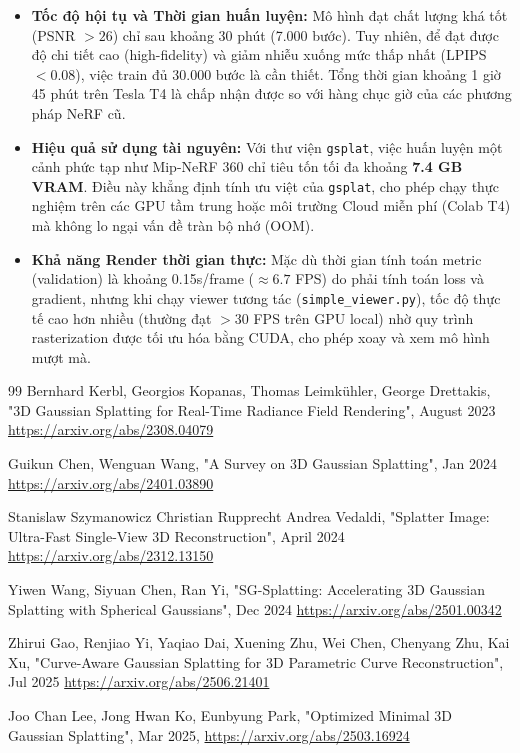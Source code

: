 \begin{itemize}
    \item \textbf{Tốc độ hội tụ và Thời gian huấn luyện:}
    Mô hình đạt chất lượng khá tốt (PSNR $> 26$) chỉ sau khoảng 30 phút (7.000 bước). Tuy nhiên, để đạt được độ chi tiết cao (high-fidelity) và giảm nhiễu xuống mức thấp nhất (LPIPS $< 0.08$), việc train đủ 30.000 bước là cần thiết. Tổng thời gian khoảng 1 giờ 45 phút trên Tesla T4 là chấp nhận được so với hàng chục giờ của các phương pháp NeRF cũ.

    \item \textbf{Hiệu quả sử dụng tài nguyên:}
    Với thư viện \texttt{gsplat}, việc huấn luyện một cảnh phức tạp như Mip-NeRF 360 chỉ tiêu tốn tối đa khoảng \textbf{7.4 GB VRAM}. Điều này khẳng định tính ưu việt của \texttt{gsplat}, cho phép chạy thực nghiệm trên các GPU tầm trung hoặc môi trường Cloud miễn phí (Colab T4) mà không lo ngại vấn đề tràn bộ nhớ (OOM).

    \item \textbf{Khả năng Render thời gian thực:}
    Mặc dù thời gian tính toán metric (validation) là khoảng 0.15s/frame ($\approx 6.7$ FPS) do phải tính toán loss và gradient, nhưng khi chạy viewer tương tác (\texttt{simple\_viewer.py}), tốc độ thực tế cao hơn nhiều (thường đạt $>30$ FPS trên GPU local) nhờ quy trình rasterization được tối ưu hóa bằng CUDA, cho phép xoay và xem mô hình mượt mà.
\end{itemize}

\newpage
\begin{thebibliography}{99}
  Bernhard Kerbl, Georgios Kopanas, Thomas Leimkühler, George Drettakis, "3D Gaussian Splatting for Real-Time Radiance Field Rendering", August 2023 \url{https://arxiv.org/abs/2308.04079}

  Guikun Chen, Wenguan Wang, "A Survey on 3D Gaussian Splatting", Jan 2024 \url{https://arxiv.org/abs/2401.03890}

  Stanislaw Szymanowicz Christian Rupprecht Andrea Vedaldi, "Splatter Image: Ultra-Fast Single-View 3D Reconstruction", April 2024 \url{https://arxiv.org/abs/2312.13150}

 Yiwen Wang, Siyuan Chen, Ran Yi, "SG-Splatting: Accelerating 3D Gaussian Splatting with Spherical Gaussians", Dec 2024 \url{https://arxiv.org/abs/2501.00342}

 Zhirui Gao, Renjiao Yi, Yaqiao Dai, Xuening Zhu, Wei Chen, Chenyang Zhu, Kai Xu, "Curve-Aware Gaussian Splatting for 3D Parametric Curve Reconstruction", Jul 2025 \url{https://arxiv.org/abs/2506.21401}

 Joo Chan Lee, Jong Hwan Ko, Eunbyung Park, "Optimized Minimal 3D Gaussian Splatting", Mar 2025, \url{https://arxiv.org/abs/2503.16924}

\end{thebibliography}
